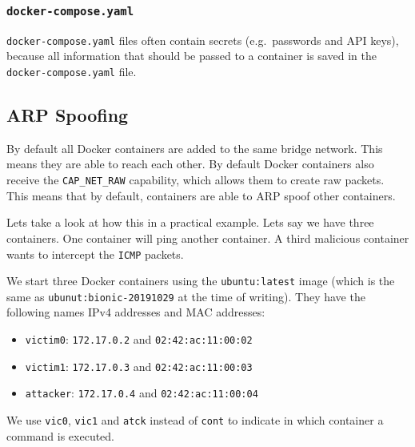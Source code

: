 \subsubsection{\texorpdfstring{\lstinline{docker-compose.yaml}}{docker-compose.yaml}}
\lstinline{docker-compose.yaml} files often contain secrets (e.g.\ passwords and API keys), because all information that should be passed to a container is saved in the \lstinline{docker-compose.yaml} file.

\subsection{ARP Spoofing}
By default all Docker containers are added to the same bridge network. This means they are able to reach each other. By default Docker containers also receive the \lstinline{CAP_NET_RAW} capability, which allows them to create raw packets. This means that by default, containers are able to ARP spoof other containers.

\hfill

Lets take a look at how this in a practical example. Lets say we have three containers. One container will ping another container. A third malicious container wants to intercept the \lstinline{ICMP} packets.

We start three Docker containers using the \lstinline{ubuntu:latest} image (which is the same as \lstinline{ubunut:bionic-20191029} at the time of writing). They have the following names IPv4 addresses and MAC addresses:
\begin{itemize}
    \item \lstinline{victim0}: \lstinline{172.17.0.2} and \lstinline{02:42:ac:11:00:02}
    \item \lstinline{victim1}: \lstinline{172.17.0.3} and \lstinline{02:42:ac:11:00:03}
    \item \lstinline{attacker}: \lstinline{172.17.0.4} and \lstinline{02:42:ac:11:00:04}
\end{itemize}

We use \lstinline{vic0}, \lstinline{vic1} and \lstinline{atck} instead of \lstinline{cont} to indicate in which container a command is executed.

